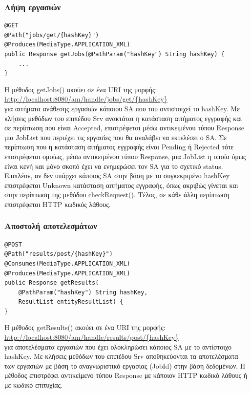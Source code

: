 \documentclass[a4paper,11pt]{article}
\begin{document}
\begin{sloppypar}
\subsubsection{Λήψη εργασιών}

\begin{lstlisting}
@GET
@Path("jobs/get/{hashKey}")
@Produces(MediaType.APPLICATION_XML)
public Response getJobs(@PathParam("hashKey") String hashKey) {
    ...
}
\end{lstlisting}

H μέθοδος getJobs() ακούει σε ένα URI της μορφής:
\\
\url{http://localhost:8080/am/handle/jobs/get/{hashKey}}
\\
για αιτήματα ανάθεσης εργασιών κάποιου SA που του αντιστοιχεί το hashKey.  Με κλήσεις μεθόδων του επιπέδου Srv ανακτάται η κατάσταση αιτήματος εγγραφής και σε περίπτωση που είναι Accepted, επιστρέφεται μέσω αντικειμένου τύπου Response μια JobList που περιέχει τις εργασίες που θα αναλάβει να εκτελέσει ο SA. Σε περίπτωση που η κατάσταση αιτήματος εγγραφής είναι Pending ή Rejected τότε επιστρέφεται ομοίως, μέσω αντικειμένου τύπου Response, μια JobList η οποία όμως είναι κενή και μόνο σκοπό έχει να ενημερώσει τον SA για το σχετικό status. Επιπλέον, αν δεν υπάρχει κάποιος SA στην βάση με το συγκεκριμένο hashKey επιστρέφεται Unknown κατάσταση αιτήματος εγγραφής, όπως ακριβώς γίνεται και στην περίπτωση της μεθόδου checkRequest(). Τέλος, σε κάθε άλλη περίπτωση επιστρέφεται HTTP κωδικός λάθους.

\subsubsection{Αποστολή αποτελεσμάτων}

\begin{lstlisting}
@POST
@Path("results/post/{hashKey}")
@Consumes(MediaType.APPLICATION_XML)
@Produces(MediaType.APPLICATION_XML)
public Response getResults(
    @PathParam("hashKey") String hashKey,
    ResultList entityResultList) {
}
\end{lstlisting}

H μέθοδος getResults() ακούει σε ένα URI της μορφής:
\\
\url{http://localhost:8080/am/handle/results/post/{hashKey}}
\\
για αποτελέσματα εργασιών που έχει ολοκληρώσει κάποιος SA με το αντίστοιχο hashKey. Με κλήσεις μεθόδων του επιπέδου Srv αποθηκεύονται τα αποτελέσματα των εργασιών με βάση το αναγνωριστικό εργασίας (JobId) στην βάση δεδομένων. Η μέθοδος επιστρέφει αντικείμενο τύπου Response με κάποιον HTTP κωδικό λάθους ή με κωδικό επιτυχίας.
\\


\end{sloppypar}
\end{document}
